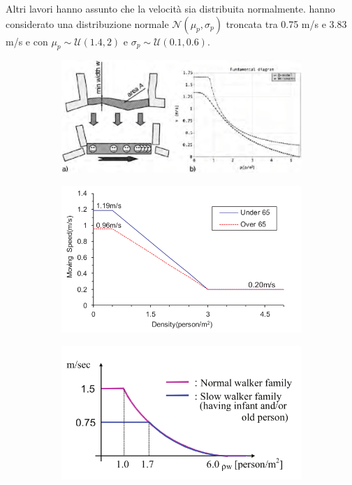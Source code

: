 Altri lavori hanno assunto che la velocità sia distribuita normalmente.
\textcite{wang2021novel} hanno considerato una distribuzione normale $\mathcal{N}(\mu_p,\sigma_p)$ troncata tra 0.75 m/s e 3.83 m/s e
con $\mu_p \sim \mathcal{U}(1.4, 2)$ e $\sigma_p \sim \mathcal{U}(0.1, 0.6)$.


\begin{figure}[ht]
    \centering
    \begin{subfigure}{0.45\textwidth}
        \includegraphics[width=\textwidth]{images/speed_lammel.png}
        \caption{}
        \label{fig:speed-lammel}
    \end{subfigure}
    \hfill
    \begin{subfigure}{0.45\textwidth}
        \includegraphics[width=\textwidth]{images/speed_Linear.png}
        \caption{}
        \label{fig:speed-linear}
    \end{subfigure}
    \begin{subfigure}{0.45\textwidth}
        \includegraphics[width=\textwidth]{images/speed_GOTO.png}

\end{subfigure}
\end{figure}
